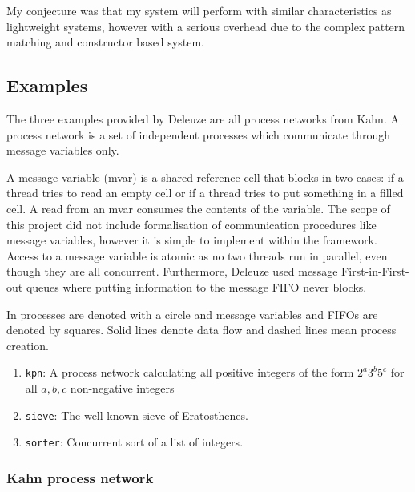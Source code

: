 \documentclass[12pt,twoside,notitlepage]{report}
\begin{document}
My conjecture was that my system will perform with similar characteristics as lightweight systems, however with a serious overhead due to the complex pattern matching and constructor based system.
\subsection{Examples}
The three examples provided by Deleuze are all process networks from Kahn\cite{kahn1976coroutines}. A process network is a set of independent processes which communicate through message variables only. 

A message variable (mvar) is a shared reference cell that blocks in two cases: if a thread tries to read an empty cell or if a thread tries to put something in a filled cell. A read from an mvar consumes the contents of the variable. The scope of this project did not include formalisation of communication procedures like message variables, however it is simple to implement within the framework. Access to a message variable is atomic as no two threads run in parallel, even though they are all concurrent. Furthermore, Deleuze used message First-in-First-out queues where putting information to the message FIFO never blocks. 

In  processes are denoted with a circle and message variables and FIFOs are denoted by squares. Solid lines denote data flow and dashed lines mean process creation.
\begin{enumerate}
\item{\verb|kpn|: A process network calculating all positive integers of the form $ 2^a3^b5^c $ for all $ a,b,c $ non-negative integers}
\item{\verb|sieve|: The well known sieve of Eratosthenes.}
\item{\verb|sorter|: Concurrent sort of a list of integers.}
\end{enumerate}
\subsubsection{Kahn process network}
\end{document}
